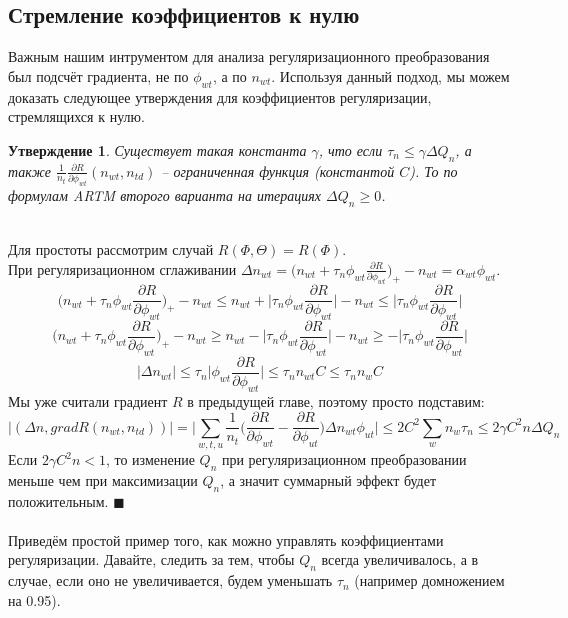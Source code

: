 \documentclass[12pt]{article}
\newtheorem{claim}[remark]{Утверждение}
\newenvironment{Proof} 
	{\par\noindent{\bf Доказательство.}} 
	{\hfill$\blacksquare$}
\renewcommand{\leq}{\leqslant}
\renewcommand{\geq}{\geqslant}
\begin{document}
           \subsection{Стремление коэффициентов к нулю}
Важным нашим интрументом для анализа регуляризационного преобразования был подсчёт градиента, не по $\phi_{wt}$, а по $n_{wt}$. Используя данный подход, мы можем доказать следующее утверждения для коэффициентов регуляризации, стремлящихся к нулю.\\
\begin{claim}
Существует такая константа $\gamma$, что если $\tau_n \leq \gamma \Delta Q_n$, а также $\frac{1}{n_t} \frac{\partial{R}}{\partial{\phi_{wt}}}(n_{wt}, n_{td})$ -- ограниченная функция (константой $C$). То по формулам ARTM второго варианта на итерациях $\Delta Q_n \geq 0$.
\end{claim}
\begin{Proof}
\ \\
Для простоты рассмотрим случай $R(\Phi, \Theta) = R(\Phi)$. \\
При регуляризационном сглаживании  $\Delta n_{wt} = \bigg( n_{wt} + \tau_n \phi_{wt} \frac{\partial{R}}{\partial{\phi_{wt}}}\bigg)_{+} - n_{wt} = \alpha_{wt} \phi_{wt}$.\\
\[
\bigg( n_{wt} + \tau_n \phi_{wt} \frac{\partial{R}}{\partial{\phi_{wt}}}\bigg)_{+} - n_{wt} \leq  n_{wt} +\bigg| \tau_n \phi_{wt} \frac{\partial{R}}{\partial{\phi_{wt}}}\bigg| - n_{wt} \leq \bigg| \tau_n \phi_{wt} \frac{\partial{R}}{\partial{\phi_{wt}}}\bigg|
\]
\[
\bigg( n_{wt} + \tau_n \phi_{wt} \frac{\partial{R}}{\partial{\phi_{wt}}}\bigg)_{+} - n_{wt} \geq  n_{wt} - \bigg| \tau_n \phi_{wt} \frac{\partial{R}}{\partial{\phi_{wt}}}\bigg| - n_{wt} \geq - \bigg| \tau_n \phi_{wt} \frac{\partial{R}}{\partial{\phi_{wt}}}\bigg|
\]
\[
|\Delta n_{wt} | \leq \tau_n\bigg|  \phi_{wt} \frac{\partial{R}}{\partial{\phi_{wt}}}\bigg| \leq \tau_n n_{wt} C \leq \tau_n n_{w} C
\]
Мы уже считали градиент $R$ в предыдущей главе, поэтому просто подставим:
\[
 \bigg|(\Delta n, grad R(n_{wt}, n_{td}) )\bigg| = \bigg| \sum\limits_{w, t, u}  \frac{1}{n_{t}}  \bigg(  \frac{\partial{R}}{\partial{\phi_{wt}}}  -  \frac{\partial{R}}{\partial{\phi_{ut}}}  \bigg)  \Delta n_{wt}  \phi_{ut} \bigg| \leq 2C^2\sum_w n_w  \tau_n \leq 2 \gamma C^2n \Delta Q_n
\]
Если $ 2 \gamma C^2n < 1$, то изменение $Q_n$ при регуляризационном преобразовании меньше чем при максимизации $Q_n$, а значит суммарный эффект будет положительным.
\end{Proof}\ \\
\ \\
Приведём простой пример того, как можно управлять коэффициентами регуляризации. Давайте, следить за тем, чтобы $Q_n$ всегда увеличивалось, а в случае, если оно не увеличивается, будем уменьшать $\tau_n$ (например домножением на 0.95).
\end{document}
